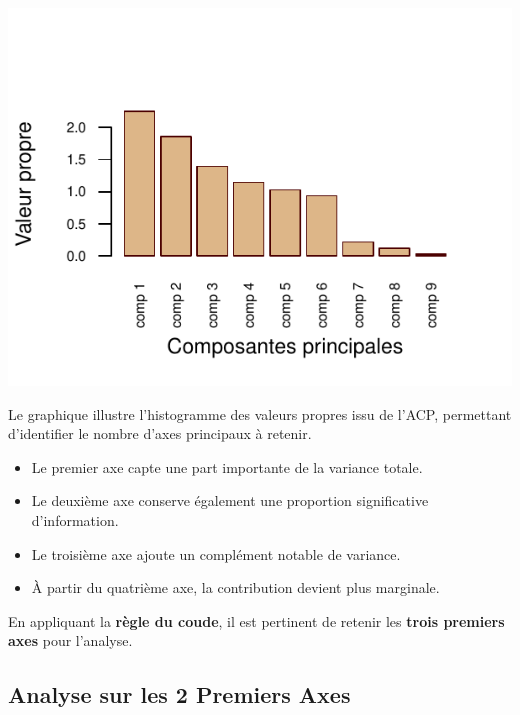 \documentclass[
  12pt,
]{article}
\providecommand{\tightlist}{%
  \setlength{\itemsep}{0pt}\setlength{\parskip}{0pt}}
\begin{document}
\begin{center}\includegraphics{rmd_final_files/figure-latex/unnamed-chunk-10-1} \end{center}

Le graphique illustre l'histogramme des valeurs propres issu de l'ACP,
permettant d'identifier le nombre d'axes principaux à retenir.

\begin{itemize}
\tightlist
\item
  Le premier axe capte une part importante de la variance totale.
\item
  Le deuxième axe conserve également une proportion significative
  d'information.
\item
  Le troisième axe ajoute un complément notable de variance.
\item
  À partir du quatrième axe, la contribution devient plus marginale.
\end{itemize}

En appliquant la \textbf{règle du coude}, il est pertinent de retenir
les \textbf{trois premiers axes} pour l'analyse.

\subsection{Analyse sur les 2 Premiers
Axes}\label{analyse-sur-les-2-premiers-axes}
\end{document}
